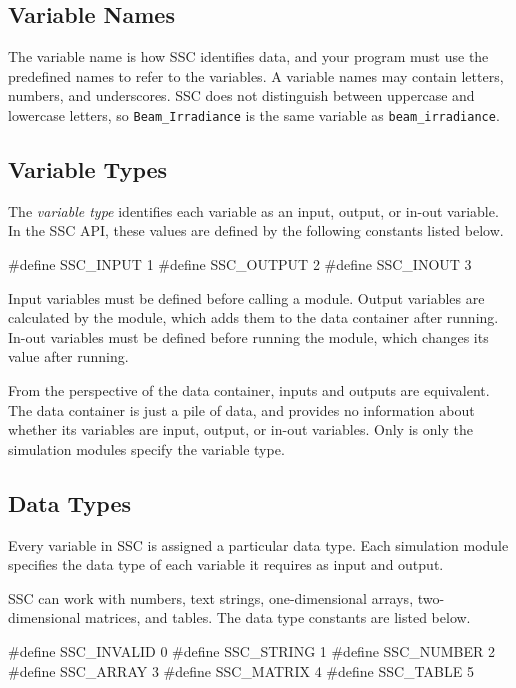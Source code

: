 \documentclass{scrartcl} %
\begin{document}
\subsection{Variable Names}

The variable name is how SSC identifies data, and your program must use the predefined names to refer to the variables. A variable names may contain letters, numbers, and underscores. SSC does not distinguish between uppercase and lowercase letters, so \texttt{Beam\_Irradiance} is the same variable as \texttt{beam\_irradiance}.

\subsection{Variable Types}

The \emph{variable type} identifies each variable as an input, output, or in-out variable.  In the SSC API, these values are defined by the following constants listed below.

\begin{verbatimtab}
#define SSC_INPUT 1
#define SSC_OUTPUT 2
#define SSC_INOUT 3
\end{verbatimtab}

Input variables must be defined before calling a module. Output variables are calculated by the module, which adds them to the data container after running. In-out variables must be defined before running the module, which changes its value after running.

From the perspective of the data container, inputs and outputs are equivalent. The data container is just a pile of data, and provides no information about whether its variables are input, output, or in-out variables. Only is only the simulation modules specify the variable type.

\subsection{Data Types}

Every variable in SSC is assigned a particular data type. Each simulation module specifies the data type of each variable it requires as input and output.

SSC can work with numbers, text strings, one-dimensional arrays, two-dimensional matrices, and tables. The data type constants are listed below.

\begin{verbatimtab}
#define SSC_INVALID 0
#define SSC_STRING 1
#define SSC_NUMBER 2
#define SSC_ARRAY 3
#define SSC_MATRIX 4
#define SSC_TABLE 5
\end{verbatimtab}
\end{document}
